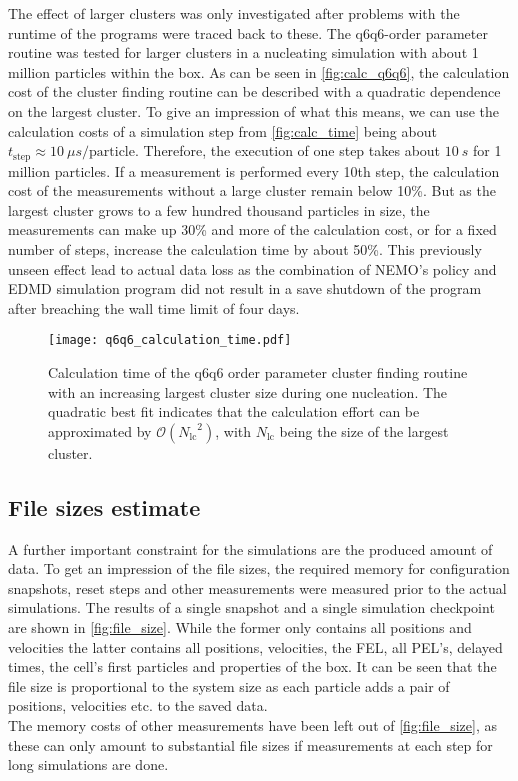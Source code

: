 The effect of larger clusters was only investigated after problems with the runtime of the programs were traced back to these. The q6q6-order parameter routine was tested for larger clusters in a nucleating simulation with about 1 million particles within the box. As can be seen in \autoref{fig:calc_q6q6}, the calculation cost of the cluster finding routine can be described with a quadratic dependence on the largest cluster. To give an impression of what this means, we can use the calculation costs of a simulation step from \autoref{fig:calc_time} being about $t_{\text{step}} \approx \SI{10}{\mu s \per \text{particle} }$. Therefore, the execution of one step takes about $\SI{10}{s}$ for 1 million particles. If a measurement is performed every 10th step, the calculation cost of the measurements without a large cluster remain below 10\%. But as the largest cluster grows to a few hundred thousand particles in size, the measurements can make up 30\% and more of the calculation cost, or for a fixed number of steps, increase the calculation time by about 50\%. This previously unseen effect lead to actual data loss as the combination of NEMO's policy and EDMD simulation program did not result in a save shutdown of the program after breaching the wall time limit of four days.

\begin{figure}[h!]
\centering
\texttt{[image: q6q6\_calculation\_time.pdf]}
\caption[Quadratic calculation time of q6q6-order parameter cluster finding routine]{Calculation time of the q6q6 order parameter cluster finding routine with an increasing largest cluster size during one nucleation. The quadratic best fit indicates that the calculation effort can be approximated by $\mathcal{O}({N_{\text{lc}}}^2)$, with $N_{\text{lc}}$ being the size of the largest cluster.}
\label{fig:calc_q6q6}
\end{figure}

\subsection{File sizes estimate}
\label{sec:file_size}
A further important constraint for the simulations are the produced amount of data. To get an impression of the file sizes, the required memory for configuration snapshots, reset steps and other measurements were measured prior to the actual simulations. The results of a single snapshot and a single simulation checkpoint are shown in \autoref{fig:file_size}. While the former only contains all positions and velocities the latter contains all positions, velocities, the FEL, all PEL's, delayed times, the cell's first particles and properties of the box. It can be seen that the file size is proportional to the system size as each particle adds a pair of positions, velocities etc. to the saved data.\\
The memory costs of other measurements have been left out of \autoref{fig:file_size}, as these can only amount to substantial file sizes if measurements at each step for long simulations are done. 

